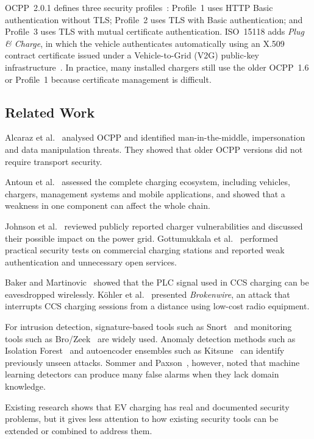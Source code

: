 \documentclass[runningheads]{llncs}
\begin{document}
OCPP~2.0.1 defines three security profiles~\cite{ocpp201}: Profile~1 uses HTTP Basic authentication without TLS; Profile~2 uses TLS with Basic authentication; and Profile~3 uses TLS with mutual certificate authentication. ISO~15118 adds \emph{Plug \& Charge}, in which the vehicle authenticates automatically using an X.509 contract certificate issued under a Vehicle-to-Grid (V2G) public-key infrastructure~\cite{iso15118}. In practice, many installed chargers still use the older OCPP~1.6 or Profile~1 because certificate management is difficult.

\subsection{Related Work}
Alcaraz et al.~\cite{alcaraz2017ocpp} analysed OCPP and identified man-in-the-middle, impersonation and data manipulation threats. They showed that older OCPP versions did not require transport security.

Antoun et al.~\cite{antoun2020detailed} assessed the complete charging ecosystem, including vehicles, chargers, management systems and mobile applications, and showed that a weakness in one component can affect the whole chain.

Johnson et al.~\cite{johnson2022review} reviewed publicly reported charger vulnerabilities and discussed their possible impact on the power grid. Gottumukkala et al.~\cite{gottumukkala2019cyber} performed practical security tests on commercial charging stations and reported weak authentication and unnecessary open services.

Baker and Martinovic~\cite{baker2019losing} showed that the PLC signal used in CCS charging can be eavesdropped wirelessly. K\"ohler et al.~\cite{kohler2023brokenwire} presented \emph{Brokenwire}, an attack that interrupts CCS charging sessions from a distance using low-cost radio equipment.

For intrusion detection, signature-based tools such as Snort~\cite{roesch1999snort} and monitoring tools such as Bro/Zeek~\cite{paxson1999bro} are widely used. Anomaly detection methods such as Isolation Forest~\cite{liu2008isolation} and autoencoder ensembles such as Kitsune~\cite{mirsky2018kitsune} can identify previously unseen attacks. Sommer and Paxson~\cite{sommer2010outside}, however, noted that machine learning detectors can produce many false alarms when they lack domain knowledge.

Existing research shows that EV charging has real and documented security problems, but it gives less attention to how existing security tools can be extended or combined to address them.
\end{document}

